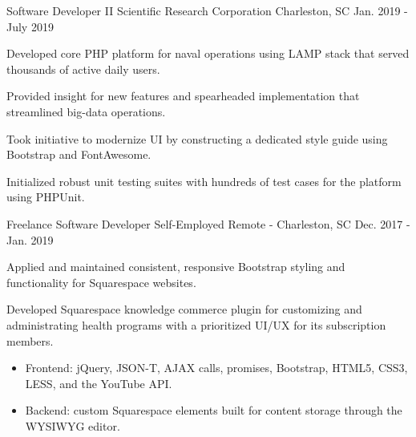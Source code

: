 \begin{cventries}

  \cventry
    {Software Developer II} %
    {Scientific Research Corporation} %
    {Charleston, SC} %
    {Jan. 2019 - July 2019} %
    {
      \begin{cvitems} %
        \item {Developed core PHP platform for naval operations using LAMP stack that served thousands of active daily users.}
        \item {Provided insight for new features and spearheaded implementation that streamlined big-data operations.}
        \item {Took initiative to modernize UI by constructing a dedicated style guide using Bootstrap and FontAwesome.}
        \item {Initialized robust unit testing suites with hundreds of test cases for the platform using PHPUnit.}
      \end{cvitems}
    }

  \cventry
    {Freelance Software Developer} %
    {Self-Employed} %
    {Remote - Charleston, SC} %
    {Dec. 2017 - Jan. 2019} %
    {
      \begin{cvitems} %
        \item {Applied and maintained consistent, responsive Bootstrap styling and functionality for Squarespace websites.}
        \item {Developed Squarespace knowledge commerce plugin for customizing and administrating health programs with a prioritized UI/UX for its subscription members.}
        \begin{itemize}
          \vspace{1.0mm}
          \item {Frontend: jQuery, JSON-T, AJAX calls, promises, Bootstrap, HTML5, CSS3, LESS, and the YouTube API.}
          \vspace{1.0mm}
          \item {Backend: custom Squarespace elements built for content storage through the WYSIWYG editor.}
        \end{itemize}
      \end{cvitems}
    }


\end{cventries}
